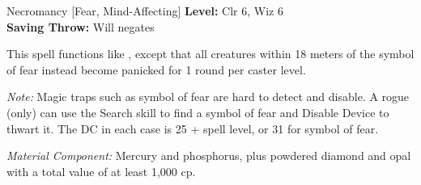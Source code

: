 {Necromancy [Fear, Mind-Affecting]}
{
	\textbf{Level:}
	Clr 6, Wiz 6\\
	\textbf{Saving Throw:}
	Will negates\\
}
{
	This spell functions like , except that all creatures within 18 meters of the symbol of fear instead become panicked for 1 round per caster level.

	\textit{Note:} Magic traps such as symbol of fear are hard to detect and disable. A rogue (only) can use the Search skill to find a symbol of fear and Disable Device to thwart it. The DC in each case is 25 + spell level, or 31 for symbol of fear.

	\textit{Material Component:}
	Mercury and phosphorus, plus powdered diamond and opal with a total value of at least 1,000 cp.

}
